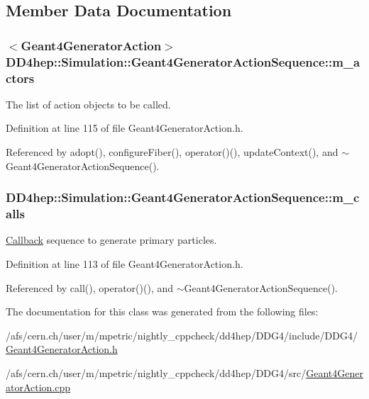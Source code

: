 \subsection{Member Data Documentation}
\hypertarget{class_d_d4hep_1_1_simulation_1_1_geant4_generator_action_sequence_a89614165b2d4cf32bbed637abca203d1}{
\subsubsection[{m\_\-actors}]{$<${\bf Geant4GeneratorAction}$>$ {\bf DD4hep::Simulation::Geant4GeneratorActionSequence::m\_\-actors}}}
\label{class_d_d4hep_1_1_simulation_1_1_geant4_generator_action_sequence_a89614165b2d4cf32bbed637abca203d1}


The list of action objects to be called. 

Definition at line 115 of file Geant4GeneratorAction.h.

Referenced by adopt(), configureFiber(), operator()(), updateContext(), and $\sim$Geant4GeneratorActionSequence().\hypertarget{class_d_d4hep_1_1_simulation_1_1_geant4_generator_action_sequence_a3861258f355c58bb19602e7d099c1c9e}{
\subsubsection[{m\_\-calls}]{ {\bf DD4hep::Simulation::Geant4GeneratorActionSequence::m\_\-calls}}}
\label{class_d_d4hep_1_1_simulation_1_1_geant4_generator_action_sequence_a3861258f355c58bb19602e7d099c1c9e}


\hyperlink{class_d_d4hep_1_1_callback}{Callback} sequence to generate primary particles. 

Definition at line 113 of file Geant4GeneratorAction.h.

Referenced by call(), operator()(), and $\sim$Geant4GeneratorActionSequence().

The documentation for this class was generated from the following files:\begin{DoxyCompactItemize}
\item 
/afs/cern.ch/user/m/mpetric/nightly\_\-cppcheck/dd4hep/DDG4/include/DDG4/\hyperlink{_geant4_generator_action_8h}{Geant4GeneratorAction.h}\item 
/afs/cern.ch/user/m/mpetric/nightly\_\-cppcheck/dd4hep/DDG4/src/\hyperlink{_geant4_generator_action_8cpp}{Geant4GeneratorAction.cpp}\end{DoxyCompactItemize}
